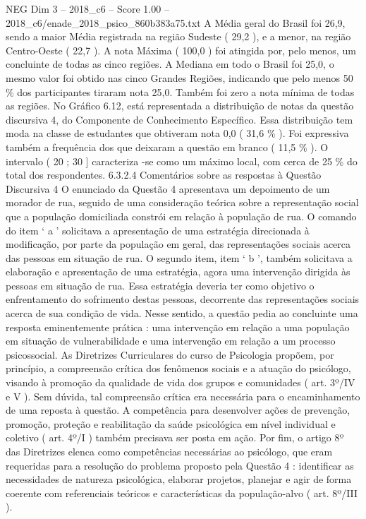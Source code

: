 \begin{textsample}{NEG Dim 3 – 2018\_c6 – Score 1.00 – 2018\_c6/enade\_2018\_psico\_860b383a75.txt}
A Média geral do Brasil foi 26,9, sendo a maior Média registrada na região Sudeste ( 29,2 ), e a menor, na região Centro-Oeste ( 22,7 ).
A nota Máxima ( 100,0 ) foi atingida por, pelo menos, um concluinte de todas as cinco regiões.
A Mediana em todo o Brasil foi 25,0, o mesmo valor foi obtido nas cinco Grandes Regiões, indicando que pelo menos 50 \% dos participantes tiraram nota 25,0.
Também foi zero a nota mínima de todas as regiões.
No Gráfico 6.12, está representada a distribuição de notas da questão discursiva 4, do Componente de Conhecimento Específico.
Essa distribuição tem moda na classe de estudantes que obtiveram nota 0,0 ( 31,6 \% ).
Foi expressiva também a frequência dos que deixaram a questão em branco ( 11,5 \% ).
O intervalo ( 20 ; 30 ] caracteriza -se como um máximo local, com cerca de 25 \% do total dos respondentes. 6.3.2.4 Comentários sobre as respostas à Questão Discursiva 4 O enunciado da Questão 4 apresentava um depoimento de um morador de rua, seguido de uma consideração teórica sobre a representação social que a população domiciliada constrói em relação à população de rua.
O comando do item ‘ a ’ solicitava a apresentação de uma estratégia direcionada à modificação, por parte da população em geral, das representações sociais acerca das pessoas em situação de rua.
O segundo item, item ‘ b ’, também solicitava a elaboração e apresentação de uma estratégia, agora uma intervenção dirigida às pessoas em situação de rua.
Essa estratégia deveria ter como objetivo o enfrentamento do sofrimento destas pessoas, decorrente das representações sociais acerca de sua condição de vida.
Nesse sentido, a questão pedia ao concluinte uma resposta eminentemente prática : uma intervenção em relação a uma população em situação de vulnerabilidade e uma intervenção em relação a um processo psicossocial.
As Diretrizes Curriculares do curso de Psicologia propõem, por princípio, a compreensão crítica dos fenômenos sociais e a atuação do psicólogo, visando à promoção da qualidade de vida dos grupos e comunidades ( art. 3º/IV e V ).
Sem dúvida, tal compreensão crítica era necessária para o encaminhamento de uma reposta à questão.
A competência para desenvolver ações de prevenção, promoção, proteção e reabilitação da saúde psicológica em nível individual e coletivo ( art. 4º/I ) também precisava ser posta em ação.
Por fim, o artigo 8º das Diretrizes elenca como competências necessárias ao psicólogo, que eram requeridas para a resolução do problema proposto pela Questão 4 : identificar as necessidades de natureza psicológica, elaborar projetos, planejar e agir de forma coerente com referenciais teóricos e características da população-alvo ( art. 8º/III ).

\end{textsample}
